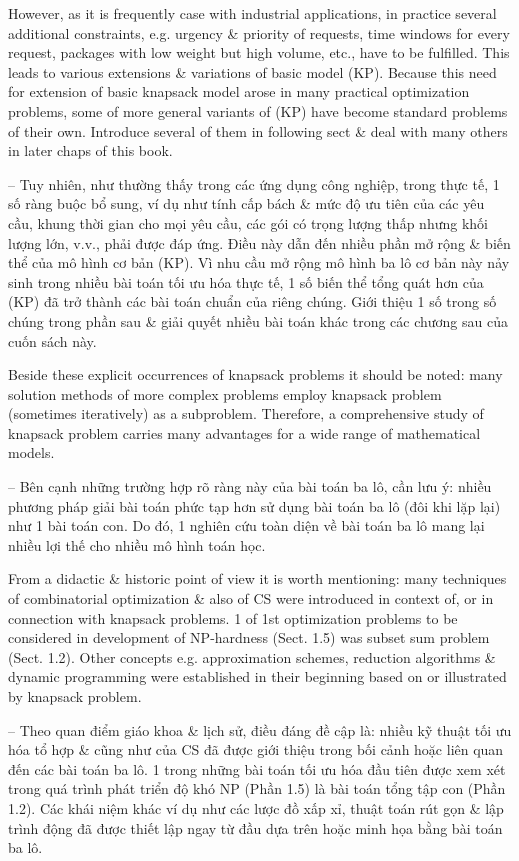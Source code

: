 \documentclass{article}
\begin{document}
\begin{itemize}
\begin{itemize}
        However, as it is frequently case with industrial applications, in practice several additional constraints, e.g. urgency \& priority of requests, time windows for every request, packages with low weight but high volume, etc., have to be fulfilled. This leads to various extensions \& variations of basic model (KP). Because this need for extension of basic knapsack model arose in many practical optimization problems, some of more general variants of (KP) have become standard problems of their own. Introduce several of them in following sect \& deal with many others in later chaps of this book.

        -- Tuy nhiên, như thường thấy trong các ứng dụng công nghiệp, trong thực tế, 1 số ràng buộc bổ sung, ví dụ như tính cấp bách \& mức độ ưu tiên của các yêu cầu, khung thời gian cho mọi yêu cầu, các gói có trọng lượng thấp nhưng khối lượng lớn, v.v., phải được đáp ứng. Điều này dẫn đến nhiều phần mở rộng \& biến thể của mô hình cơ bản (KP). Vì nhu cầu mở rộng mô hình ba lô cơ bản này nảy sinh trong nhiều bài toán tối ưu hóa thực tế, 1 số biến thể tổng quát hơn của (KP) đã trở thành các bài toán chuẩn của riêng chúng. Giới thiệu 1 số trong số chúng trong phần sau \& giải quyết nhiều bài toán khác trong các chương sau của cuốn sách này.

        Beside these explicit occurrences of knapsack problems it should be noted: many solution methods of more complex problems employ knapsack problem (sometimes iteratively) as a subproblem. Therefore, a comprehensive study of knapsack problem carries many advantages for a wide range of mathematical models.

        -- Bên cạnh những trường hợp rõ ràng này của bài toán ba lô, cần lưu ý: nhiều phương pháp giải bài toán phức tạp hơn sử dụng bài toán ba lô (đôi khi lặp lại) như 1 bài toán con. Do đó, 1 nghiên cứu toàn diện về bài toán ba lô mang lại nhiều lợi thế cho nhiều mô hình toán học.

        From a didactic \& historic point of view it is worth mentioning: many techniques of combinatorial optimization \& also of CS were introduced in context of, or in connection with knapsack problems. 1 of 1st optimization problems to be considered in development of NP-hardness (Sect. 1.5) was subset sum problem (Sect. 1.2). Other concepts e.g. approximation schemes, reduction algorithms \& dynamic programming were established in their beginning based on or illustrated by knapsack problem.

        -- Theo quan điểm giáo khoa \& lịch sử, điều đáng đề cập là: nhiều kỹ thuật tối ưu hóa tổ hợp \& cũng như của CS đã được giới thiệu trong bối cảnh hoặc liên quan đến các bài toán ba lô. 1 trong những bài toán tối ưu hóa đầu tiên được xem xét trong quá trình phát triển độ khó NP (Phần 1.5) là bài toán tổng tập con (Phần 1.2). Các khái niệm khác ví dụ như các lược đồ xấp xỉ, thuật toán rút gọn \& lập trình động đã được thiết lập ngay từ đầu dựa trên hoặc minh họa bằng bài toán ba lô.


\end{itemize}
\end{itemize}
\end{document}
